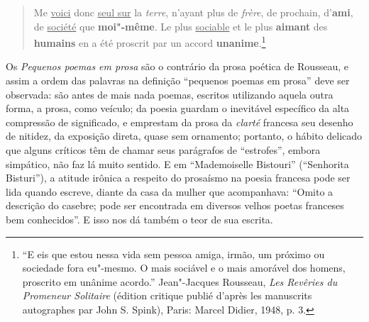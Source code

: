 \begin{quote}
Me \underline{voici} donc \underline{seul sur} la \textit{terre}, n’ayant plus
de \textit{frère}, de prochain, d’\textbf{ami}, de \underline{société} que
\textbf{moi"-même}. Le plus \underline{sociable} et le plus \textbf{aimant} des \textbf{humains} en a été
proscrit par un accord \textbf{unanime}.\footnote{ “E eis que estou nessa vida sem pessoa amiga, irmão, um próximo ou
sociedade fora eu"-mesmo. O mais sociável e o mais amorável dos homens,
proscrito em unânime acordo.” Jean"-Jacques Rousseau,  \textit{Les
Revêries du Promeneur Solitaire} (édition critique publié d’après les
manuscrits autographes par John S. Spink), Paris: Marcel
Didier, 1948, p. 3.}
\end{quote}

Os \textit{Pequenos poemas em prosa} são o contrário da prosa poética de Rousseau,
 e assim a ordem das palavras na definição “pequenos poemas em prosa” 
deve ser observada: são antes de mais nada poemas, escritos utilizando 
aquela outra forma, a prosa, como veículo; da poesia guardam o inevitável 
específico da alta compressão de significado, e emprestam da prosa da \textit{clarté}
 francesa seu desenho de nitidez, da exposição direta, quase sem ornamento; 
portanto, o hábito delicado que alguns críticos têm de chamar 
seus parágrafos de “estrofes”, embora simpático, não faz lá muito sentido. E
em “Mademoiselle Bistouri” (“Senhorita Bisturi”), a atitude irônica a
respeito do prosaísmo na poesia francesa pode ser lida quando escreve,
diante da casa da mulher que acompanhava: “Omito a descrição do
casebre; pode ser encontrada em diversos velhos poetas franceses bem
conhecidos”. E isso nos dá também o teor de sua escrita.

%
%
%

